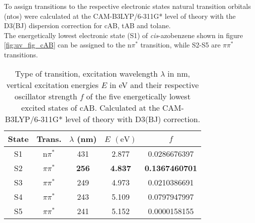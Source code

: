 %
%
%
%
To assign transitions to the respective electronic states natural transition orbitals (ntos) were calculated at the CAM-B3LYP/6-311G* level of theory with the D3(BJ) dispersion correction for cAB, tAB and tolane.\\
The energetically lowest electronic state (S1) of \textit{cis}-azobenzene shown in figure \ref{fig:uv_fig_cAB} can be assigned to the n$\pi^*$ transition, while S2-S5 are $\pi\pi^*$ transitions. 
%
%
\begin{table}[H]
\caption{Type of transition, excitation wavelength $\lambda$ in nm, vertical excitation energies $E$ in eV and their respective oscillator strength $f$ of the five energetically lowest excited states of cAB. Calculated at the CAM-B3LYP/6-311G* level of theory with D3(BJ) correction.}
\label{tab:excited_states_cAB}
\vspace{0.1 cm}
\centering
\begin{tabular}{ccccc}
\toprule
State & Trans. & $\lambda$ (nm) & $E$ $\left(\si{\eV}\right)$ & $f$    \\
\midrule
S1    & n$\pi^*$		& 431			& 2.877				& 0.0286676397          \\
S2    & $\pi\pi^*$ 		& \textbf{256}	& \textbf{4.837}	& \textbf{0.1367460701} \\
S3    & $\pi\pi^*$ 		& 249			& 4.973             & 0.0210386691          \\
S4    & $\pi\pi^*$		& 243			& 5.109             & 0.0797947997          \\
S5    & $\pi\pi^*$		& 241			& 5.152             & 0.0000158155         \\
\bottomrule
\end{tabular}
\end{table}
%
%
